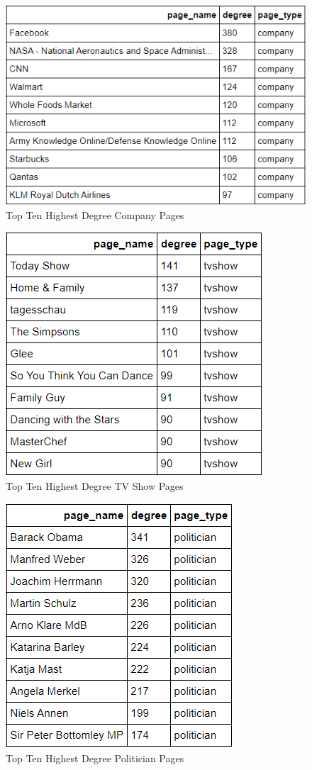\documentclass[11pt,twocolumn]{article}
\begin{document}
\begin{figure}[hbt!]
\includegraphics[scale=0.4]{top_ten_degree_company.png} 
\caption{Top Ten Highest Degree Company Pages}
\end{figure}
\begin{figure}[hbt!]
\includegraphics[scale=0.57]{top_ten_degree_tvshow.png} 
\caption{Top Ten Highest Degree TV Show Pages}
\end{figure}

\begin{figure}[hbt!]
\includegraphics[scale=0.7]{top_ten_degree_politician.png} 
\caption{Top Ten Highest Degree Politician Pages}
\end{figure}
\end{document}
